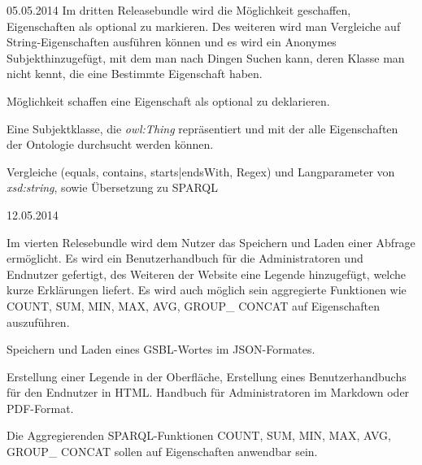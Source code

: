 \begin{release}{05.05.2014}
Im dritten Releasebundle wird die Möglichkeit geschaffen, Eigenschaften als optional zu markieren. Des weiteren wird man Vergleiche auf String-Eigenschaften ausführen können und es wird ein \glqq Anonymes Subjekt\grqq hinzugefügt, mit dem man nach Dingen Suchen kann, deren  Klasse man nicht kennt, die eine Bestimmte Eigenschaft haben.

%
Möglichkeit schaffen eine Eigenschaft als optional zu deklarieren.

%
Eine Subjektklasse, die \textit{owl:Thing} repräsentiert und mit der alle Eigenschaften der Ontologie durchsucht werden können.

%
Vergleiche (equals, contains, starts|endsWith,  Regex) und Langparameter von \textit{xsd:string}, sowie Übersetzung zu SPARQL

\end{release}

\begin{release}{12.05.2014}

Im vierten Relesebundle wird dem Nutzer das Speichern und Laden einer Abfrage ermöglicht. Es wird ein Benutzerhandbuch für die Administratoren und Endnutzer gefertigt, des Weiteren der Website eine Legende hinzugefügt, welche kurze Erklärungen liefert. Es wird auch möglich sein aggregierte Funktionen wie \glqq COUNT, SUM, MIN, MAX, AVG, GROUP\_ CONCAT \grqq auf Eigenschaften auszuführen.


%
Speichern und Laden eines GSBL-Wortes im JSON-Formates.

%
Erstellung einer Legende in der Oberfläche, Erstellung eines Benutzerhandbuchs für den Endnutzer in HTML. Handbuch für Administratoren im Markdown oder PDF-Format.

%
Die Aggregierenden SPARQL-Funktionen \glqq COUNT, SUM, MIN, MAX, AVG, GROUP\_ CONCAT \grqq sollen auf Eigenschaften anwendbar sein.

\end{release}

